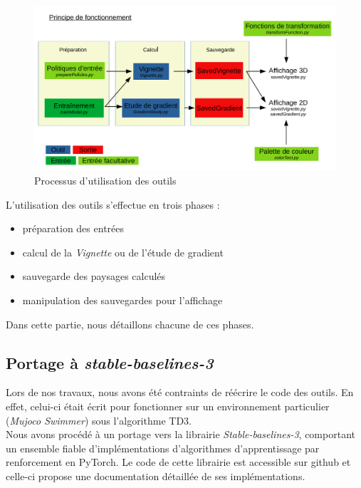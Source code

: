 \documentclass[12pt]{article}
\begin{document}
\begin{figure}[htp]
    \centering
    \includegraphics[width=18cm]{Images/Principe}
    \caption{Processus d'utilisation des outils}
    \label{fig:principe}
\end{figure}

\newpage
L'utilisation des outils s'effectue en trois phases : 
\begin{itemize}
	\setlength{\itemindent}{4em}
	\item préparation des entrées
	\item calcul de la \emph{Vignette} ou de l'étude de gradient
	\item sauvegarde des paysages calculés
	\item manipulation des sauvegardes pour l'affichage
\end{itemize}

Dans cette partie, nous détaillons chacune de ces phases.

\subsection*{Portage à \emph{stable-baselines-3}}

Lors de nos travaux, nous avons été contraints de réécrire le code des outils. En effet, celui-ci était écrit pour fonctionner sur un environnement particulier (\emph{Mujoco Swimmer}) sous l’algorithme TD3. \\

Nous avons procédé à un portage vers la librairie \emph{Stable-baselines-3}, comportant un ensemble fiable d’implémentations d’algorithmes d’apprentissage par renforcement en PyTorch. Le code de cette librairie est accessible sur github et celle-ci propose une documentation détaillée de ses implémentations. \\
\end{document}
